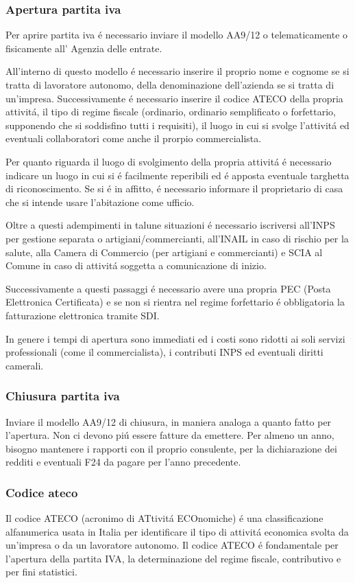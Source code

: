 \documentclass{article}
\begin{document}
\subsubsection{Apertura partita iva}
Per aprire partita iva \'e necessario inviare il modello AA9/12 o telematicamente o fisicamente all' Agenzia delle entrate. 

All'interno di questo modello \'e necessario inserire il proprio nome e cognome se si tratta di lavoratore autonomo, della denominazione dell'azienda se si tratta di un'impresa. Successivamente \'e necessario inserire il codice ATECO della propria attivit\'a, il tipo di regime fiscale (ordinario, ordinario semplificato o forfettario, supponendo che si soddisfino tutti i requisiti), il luogo in cui si svolge l'attivit\'a ed eventuali collaboratori come anche il prorpio commercialista.

Per quanto riguarda il luogo di svolgimento della propria attivit\'a \'e necessario indicare un luogo in cui si \'e facilmente reperibili ed \'e apposta eventuale targhetta di riconoscimento. Se si \'e in affitto, \'e necessario informare il proprietario di casa che si intende usare l'abitazione come ufficio.

Oltre a questi adempimenti in talune situazioni \'e necessario iscriversi all'INPS per gestione separata o artigiani/commercianti, all'INAIL in caso di rischio per la salute, alla Camera di Commercio (per artigiani e commercianti) e SCIA al Comune in caso di  attivit\'a soggetta a comunicazione di inizio.

Successivamente a questi passaggi \'e necessario avere una propria PEC (Posta Elettronica Certificata) e se non si rientra nel regime forfettario \'e obbligatoria la fatturazione elettronica tramite SDI. 

In genere i tempi di apertura sono immediati ed i costi sono ridotti ai soli servizi professionali (come il commercialista), i contributi INPS ed eventuali diritti camerali.

\subsubsection{Chiusura partita iva}
Inviare il modello AA9/12 di chiusura, in maniera analoga a quanto fatto per l'apertura. Non ci devono pi\'u essere fatture da emettere. Per almeno un anno, bisogno mantenere i rapporti con il proprio consulente, per la dichiarazione dei redditi e eventuali F24 da pagare per l'anno precedente.

\subsubsection{Codice ateco}
Il codice ATECO (acronimo di ATtivit\'a ECOnomiche) \'e una classificazione alfanumerica usata in Italia per identificare il tipo di attivit\'a economica svolta da un'impresa o da un lavoratore autonomo. Il codice ATECO \'e fondamentale per l'apertura della partita IVA, la determinazione del regime fiscale, contributivo e per fini statistici. 
\end{document}
